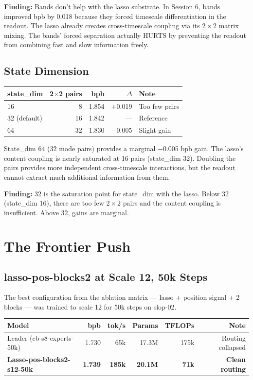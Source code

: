 \documentclass[11pt,a4paper]{report}
\newcommand{\finding}[1]{\textcolor{finding}{\textbf{Finding:}} #1}
\begin{document}
\finding{Bands don't help with the lasso substrate.} In Session 6, bands improved bpb by 0.018 because they forced timescale differentiation in the readout. The lasso already creates cross-timescale coupling via its $2 \times 2$ matrix mixing. The bands' forced separation actually HURTS by preventing the readout from combining fast and slow information freely.

\section{State Dimension}

\begin{center}
\begin{tabular}{lrrrl}
\toprule
state\_dim & 2$\times$2 pairs & bpb & $\Delta$ & Note \\
\midrule
16 & 8 & 1.854 & $+$0.019 & Too few pairs \\
32 (default) & 16 & 1.842 & --- & Reference \\
64 & 32 & 1.830 & $-$0.005 & Slight gain \\
\bottomrule
\end{tabular}
\end{center}

State\_dim 64 (32 mode pairs) provides a marginal $-$0.005 bpb gain. The lasso's content coupling is nearly saturated at 16 pairs (state\_dim 32). Doubling the pairs provides more independent cross-timescale interactions, but the readout cannot extract much additional information from them.

\finding{32 is the saturation point for state\_dim with the lasso.} Below 32 (state\_dim 16), there are too few $2 \times 2$ pairs and the content coupling is insufficient. Above 32, gains are marginal.


\chapter{The Frontier Push}

\section{lasso-pos-blocks2 at Scale 12, 50k Steps}

The best configuration from the ablation matrix --- lasso + position signal + 2 blocks --- was trained to scale 12 for 50k steps on slop-02.

\begin{center}
\begin{tabular}{lrrrrr}
\toprule
Model & bpb & tok/s & Params & TFLOPs & Note \\
\midrule
Leader (cb-s8-experts-50k) & 1.730 & 65k & 17.3M & 175k & Routing collapsed \\
\textbf{Lasso-pos-blocks2-s12-50k} & \textbf{1.739} & \textbf{185k} & \textbf{20.1M} & \textbf{71k} & \textbf{Clean routing} \\
\bottomrule
\end{tabular}
\end{center}
\end{document}
